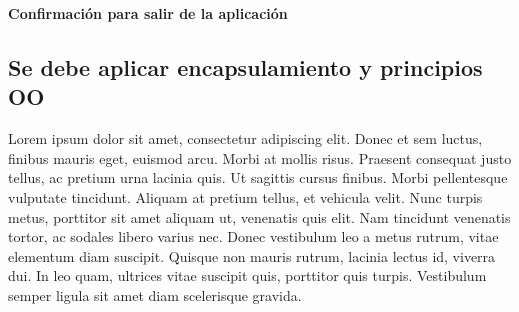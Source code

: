 \clearpage

\textbf{Confirmación para salir de la aplicación}

\begin{multicols}{2}

    \columnbreak

\end{multicols}

\subsection{Se debe aplicar encapsulamiento y principios OO}

Lorem ipsum dolor sit amet, consectetur adipiscing elit. Donec et sem luctus, finibus mauris eget, euismod arcu. Morbi at mollis risus. Praesent consequat justo tellus, ac pretium urna lacinia quis. Ut sagittis cursus finibus. Morbi pellentesque vulputate tincidunt. Aliquam at pretium tellus, et vehicula velit. Nunc turpis metus, porttitor sit amet aliquam ut, venenatis quis elit. Nam tincidunt venenatis tortor, ac sodales libero varius nec. Donec vestibulum leo a metus rutrum, vitae elementum diam suscipit. Quisque non mauris rutrum, lacinia lectus id, viverra dui. In leo quam, ultrices vitae suscipit quis, porttitor quis turpis. Vestibulum semper ligula sit amet diam scelerisque gravida.

